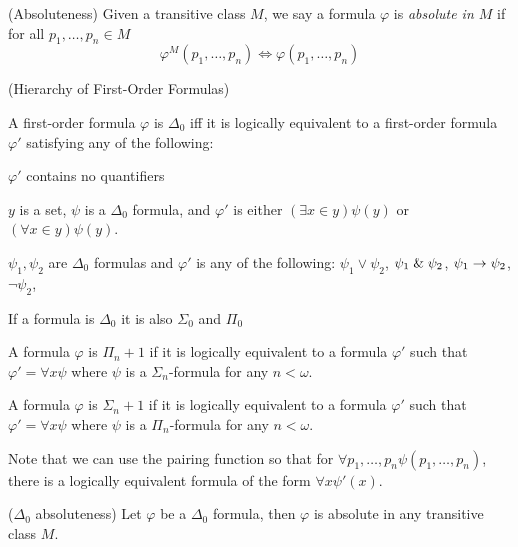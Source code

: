 \begin{definition}{(Absoluteness)}
Given a transitive class $M$, we say a formula $\varphi$ is \emph{absolute in $M$} if for all $p_1, \ldots, p_n \in M$
\begin{equation}
\varphi^M(p_1, \ldots, p_n) \iff \varphi(p_1, \ldots, p_n)
\end{equation}
\end{definition}

\begin{definition}{(Hierarchy of First-Order Formulas)}\\
\bce[(I)]
\item A first-order formula $\varphi$ is $\Delta_0$ iff it is logically equivalent to a first-order formula $\varphi'$ satisfying any of the following:
\bce[(i)]
\item $\varphi'$ contains no quantifiers
\item $y$ is a set, $\psi$ is a $\Delta_0$ formula, and $\varphi'$ is either $(\exists x \in y)\psi(y)$ or $(\forall x \in y)\psi(y)$.
\item $\psi_1, \psi_2$ are $\Delta_0$ formulas and $\varphi'$ is any of the following: $\psi_1 \lor \psi_2$, $\psi_1 \mathrel{\&} \psi_2$, $\psi_1 \rightarrow \psi_2$, $\neg \psi_2$, 
\ece
\item If a formula is $\Delta_0$ it is also $\Sigma_0$ and $\Pi_0$
\item A formula $\varphi$ is $\Pi_n+1$ if it is logically equivalent to a formula $\varphi'$ such that $\varphi' = \forall x \psi$ where $\psi$ is a $\Sigma_n$-formula for any $n < \omega$.
\item A formula $\varphi$ is $\Sigma_n+1$ if it is logically equivalent to a formula $\varphi'$ such that $\varphi' = \forall x \psi$ where $\psi$ is a $\Pi_n$-formula for any $n < \omega$.
\ece
\end{definition}
Note that we can use the pairing function so that for $\forall p_1, \ldots, p_n \psi(p_1, \ldots, p_n)$, there is a logically equivalent formula of the form $\forall x \psi'(x)$.

\begin{lemma}{($\Delta_0$ absoluteness)}\label{lemma:delta_0_absoluteness}
Let $\varphi$ be a $\Delta_0$ formula, then $\varphi$ is absolute in any transitive class $M$.
\end{lemma}

